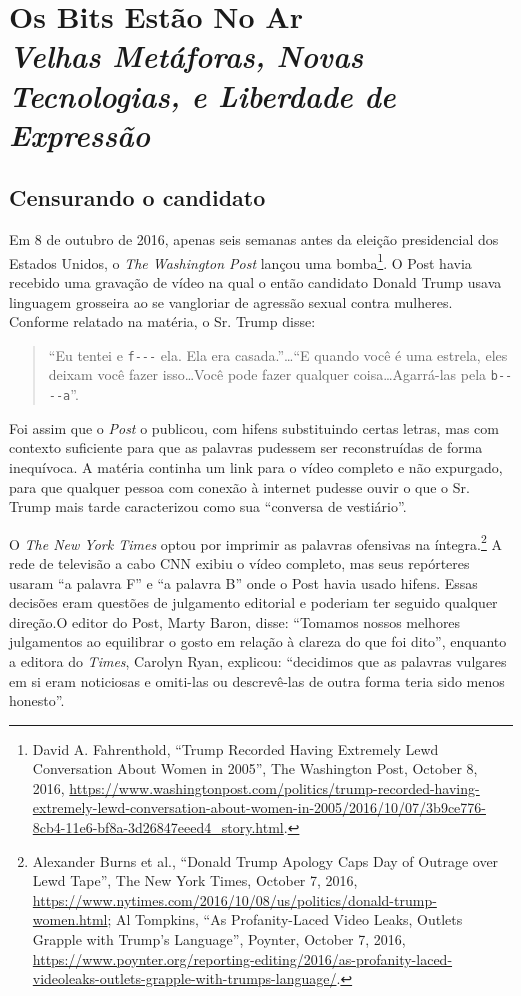 \documentclass{book}
\newcommand{\ingles}[1]{\textit{#1}}
\begin{document}
\chapter[Os Bits Estão No Ar]{Os Bits Estão No Ar\\\large\textit{Velhas Metáforas, Novas Tecnologias, e Liberdade de Expressão}}
\label{cap8:os}

\section{Censurando o candidato}
\label{cap8:os-censurando}
Em 8 de outubro de 2016, apenas seis semanas antes da eleição presidencial dos
Estados Unidos, o \ingles{The Washington Post} lançou uma bomba\footnote{David A.
Fahrenthold, ``Trump Recorded Having Extremely Lewd Conversation About Women in
2005'', The Washington Post, October 8, 2016,
\url{https://www.washingtonpost.com/politics/trump-recorded-having-extremely-lewd-conversation-about-women-in-2005/2016/10/07/3b9ce776-8cb4-11e6-bf8a-3d26847eeed4_story.html}.}. 
O Post havia recebido uma gravação de vídeo na qual o então candidato Donald Trump
usava linguagem grosseira ao se vangloriar de agressão sexual contra mulheres.
Conforme relatado na matéria, o Sr. Trump disse:

\begin{quote}
``Eu tentei e \verb|f---| ela. Ela era casada.''\ldots ``E quando você é uma estrela,
eles deixam você fazer isso\ldots Você pode fazer qualquer coisa\ldots Agarrá-las
pela \verb|b----a|''.
\end{quote}

Foi assim que o \ingles{Post} o publicou, com hifens substituindo certas letras,
mas com contexto suficiente para que as palavras pudessem ser reconstruídas de
forma inequívoca. A matéria continha um link para o vídeo completo e não expurgado,
para que qualquer pessoa com conexão à internet pudesse ouvir o que o Sr. Trump
mais tarde caracterizou como sua ``conversa de vestiário''.

O \ingles{The New York Times} optou por imprimir as palavras ofensivas na íntegra.\footnote{
Alexander Burns et al., ``Donald Trump Apology Caps Day of Outrage over Lewd
Tape'', The New York Times, October 7, 2016,
\url{https://www.nytimes.com/2016/10/08/us/politics/donald-trump-women.html}; Al
Tompkins, ``As Profanity-Laced Video Leaks, Outlets Grapple with Trump's Language'',
Poynter, October 7, 2016,
\url{https://www.poynter.org/reporting-editing/2016/as-profanity-laced-videoleaks-outlets-grapple-with-trumps-language/}.}
A rede de televisão a cabo CNN exibiu o vídeo completo, mas seus repórteres usaram
``a palavra F'' e ``a palavra B'' onde o Post havia usado hifens. Essas decisões
eram questões de julgamento editorial e poderiam ter seguido qualquer direção.O
editor do Post, Marty Baron, disse: ``Tomamos nossos melhores julgamentos ao
equilibrar o gosto em relação à clareza do que foi dito'', enquanto a editora do
\ingles{Times}, Carolyn Ryan, explicou: ``decidimos que as palavras vulgares em
si eram noticiosas e omiti-las ou descrevê-las de outra forma teria sido menos
honesto''.
\end{document}
